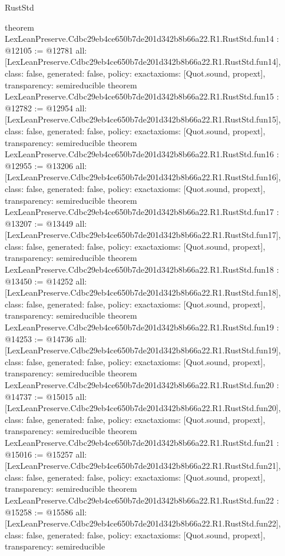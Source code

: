 \begin{lexlean}{RustStd}
\begin{coremodule}
{}
theorem LexLeanPreserve.Cdbc29eb4ce650b7de201d342b8b66a22.R1.RustStd.fun14 : @12105 := @12781 {
  all: [LexLeanPreserve.Cdbc29eb4ce650b7de201d342b8b66a22.R1.RustStd.fun14],
  class: false,
  generated: false,
  policy: exact{axioms: [Quot.sound, propext]},
  transparency: semireducible
}
theorem LexLeanPreserve.Cdbc29eb4ce650b7de201d342b8b66a22.R1.RustStd.fun15 : @12782 := @12954 {
  all: [LexLeanPreserve.Cdbc29eb4ce650b7de201d342b8b66a22.R1.RustStd.fun15],
  class: false,
  generated: false,
  policy: exact{axioms: [Quot.sound, propext]},
  transparency: semireducible
}
theorem LexLeanPreserve.Cdbc29eb4ce650b7de201d342b8b66a22.R1.RustStd.fun16 : @12955 := @13206 {
  all: [LexLeanPreserve.Cdbc29eb4ce650b7de201d342b8b66a22.R1.RustStd.fun16],
  class: false,
  generated: false,
  policy: exact{axioms: [Quot.sound, propext]},
  transparency: semireducible
}
theorem LexLeanPreserve.Cdbc29eb4ce650b7de201d342b8b66a22.R1.RustStd.fun17 : @13207 := @13449 {
  all: [LexLeanPreserve.Cdbc29eb4ce650b7de201d342b8b66a22.R1.RustStd.fun17],
  class: false,
  generated: false,
  policy: exact{axioms: [Quot.sound, propext]},
  transparency: semireducible
}
theorem LexLeanPreserve.Cdbc29eb4ce650b7de201d342b8b66a22.R1.RustStd.fun18 : @13450 := @14252 {
  all: [LexLeanPreserve.Cdbc29eb4ce650b7de201d342b8b66a22.R1.RustStd.fun18],
  class: false,
  generated: false,
  policy: exact{axioms: [Quot.sound, propext]},
  transparency: semireducible
}
theorem LexLeanPreserve.Cdbc29eb4ce650b7de201d342b8b66a22.R1.RustStd.fun19 : @14253 := @14736 {
  all: [LexLeanPreserve.Cdbc29eb4ce650b7de201d342b8b66a22.R1.RustStd.fun19],
  class: false,
  generated: false,
  policy: exact{axioms: [Quot.sound, propext]},
  transparency: semireducible
}
theorem LexLeanPreserve.Cdbc29eb4ce650b7de201d342b8b66a22.R1.RustStd.fun20 : @14737 := @15015 {
  all: [LexLeanPreserve.Cdbc29eb4ce650b7de201d342b8b66a22.R1.RustStd.fun20],
  class: false,
  generated: false,
  policy: exact{axioms: [Quot.sound, propext]},
  transparency: semireducible
}
theorem LexLeanPreserve.Cdbc29eb4ce650b7de201d342b8b66a22.R1.RustStd.fun21 : @15016 := @15257 {
  all: [LexLeanPreserve.Cdbc29eb4ce650b7de201d342b8b66a22.R1.RustStd.fun21],
  class: false,
  generated: false,
  policy: exact{axioms: [Quot.sound, propext]},
  transparency: semireducible
}
theorem LexLeanPreserve.Cdbc29eb4ce650b7de201d342b8b66a22.R1.RustStd.fun22 : @15258 := @15586 {
  all: [LexLeanPreserve.Cdbc29eb4ce650b7de201d342b8b66a22.R1.RustStd.fun22],
  class: false,
  generated: false,
  policy: exact{axioms: [Quot.sound, propext]},
  transparency: semireducible
}
\end{coremodule}
\end{lexlean}
